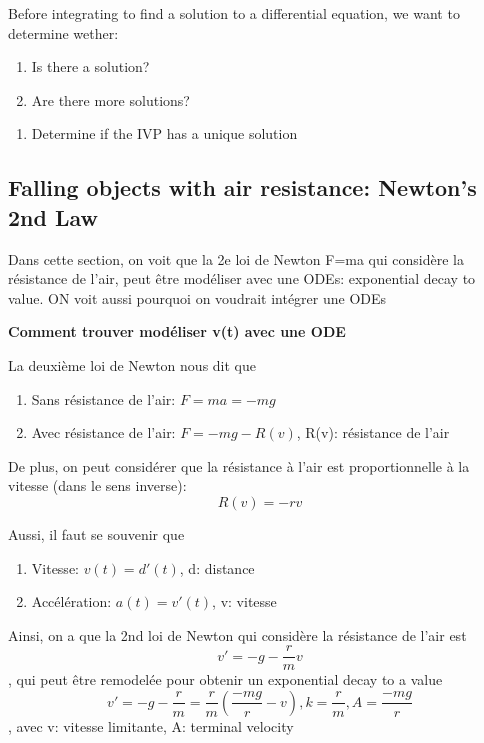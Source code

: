 \documentclass{article}
\begin{document}
\begin{intuition}
    Before integrating to find a solution to a differential equation,
    we want to determine wether:
    \begin{enumerate}
        \item Is there a solution?
	\item Are there more solutions?
    \end{enumerate}
\end{intuition}


\begin{problem}
    \begin{enumerate}
        \item Determine if the IVP has a unique solution
    \end{enumerate}
\end{problem}

\subsection{Falling objects with air resistance: Newton's 2nd Law}

Dans cette section, on voit que la 2e loi de Newton F=ma qui considère
la résistance de l'air, peut être modéliser avec une ODEs: exponential
decay to value. ON voit aussi pourquoi on voudrait intégrer une ODEs

\textbf{Comment trouver modéliser v(t) avec une ODE}

La deuxième loi de Newton nous dit que
\begin{enumerate}
    \item Sans résistance de l'air: $ F=ma=-mg $
    \item Avec résistance de l'air: $ F=-mg - R(v) $, R(v): résistance
	de l'air
\end{enumerate}

De plus, on peut considérer que la résistance à l'air est proportionnelle
à la vitesse (dans le sens inverse): $$ R(v) = -rv $$

Aussi, il faut se souvenir que
\begin{enumerate}
    \item Vitesse: $ v(t) = d'(t) $, d: distance
    \item Accélération: $ a(t) = v'(t) $, v: vitesse
\end{enumerate}

Ainsi, on a que la 2nd loi de Newton qui considère la résistance de l'air
est $$ v' = -g - \frac{r}{m} v $$, qui peut être remodelée pour obtenir
un exponential decay to a value
$$ v' = -g - \frac{r}{m} = \frac{r}{m} (\frac{-mg}{r} - v),
k = \frac{r}{m}, A = \frac{-mg}{r}$$, avec v: vitesse limitante,
A: terminal velocity
\end{document}
